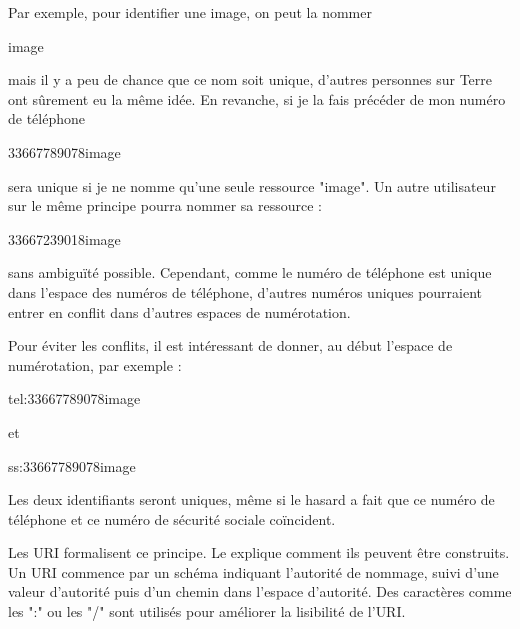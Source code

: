 Par exemple, pour identifier une image, on peut la nommer

\begin{termc}[backgroundcolor=\color{palerod}, language=json, basicstyle=\ttfamily, escapechar=@]
image
\end{termc}

\noindent

mais il y a peu de chance que ce nom soit unique, d'autres personnes sur Terre ont sûrement eu la même idée. En revanche, si je la fais précéder de mon numéro de téléphone

\begin{termc}[backgroundcolor=\color{palerod}, language=json, basicstyle=\ttfamily, escapechar=@]
33667789078image
\end{termc}


\noindent
 sera unique si je ne nomme qu'une seule ressource "image". Un autre utilisateur sur le même principe pourra nommer sa ressource :

\begin{termc}[backgroundcolor=\color{palerod}, language=json, basicstyle=\ttfamily, escapechar=@]
33667239018image
\end{termc}


\noindent
sans ambiguïté possible. Cependant, comme le numéro de téléphone est unique dans l'espace des numéros de téléphone, d'autres numéros uniques pourraient entrer en conflit dans d'autres espaces de numérotation. 

Pour éviter les conflits, il est intéressant de donner, au début l'espace de numérotation, par exemple :

\begin{termc}[backgroundcolor=\color{palerod}, language=json, basicstyle=\ttfamily, escapechar=@]
tel:33667789078image
\end{termc}

\noindent
et

\begin{termc}[backgroundcolor=\color{palerod}, language=json, basicstyle=\ttfamily, escapechar=@]
ss:33667789078image
\end{termc}


\noindent
Les deux identifiants seront uniques, même si le hasard a fait que ce numéro de téléphone et ce numéro de sécurité sociale coïncident.

      \vspace{1em}


Les \ac{URI} formalisent ce principe. Le  explique comment ils peuvent être construits. Un URI commence par un schéma indiquant l’autorité de nommage, suivi d’une valeur d’autorité puis d’un chemin dans l’espace d’autorité. Des caractères comme les ":" ou les "/" sont utilisés pour améliorer la lisibilité de l'\ac{URI}.




